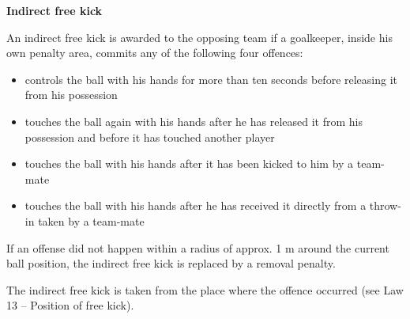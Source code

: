 \bigskip

{\bfseries Indirect free kick}

\headlinebox

An indirect free kick is awarded to the opposing team if a goalkeeper, inside his own penalty area, commits any of the following four offences: 

\begin{itemize}
\item controls the ball with his hands for more than ten seconds before releasing it from his possession
\item touches the ball again with his hands after he has released it from his possession and before it has touched another player
\item touches the ball with his hands after it has been  kicked to him by a team-mate
\item touches the ball with his hands after he has received it directly from a throw-in taken by a team-mate
\end{itemize}

\bigskip


If an offense did not happen within a radius of approx. 1 m
around the current ball position, the indirect free kick is replaced by a
removal penalty.


\bigskip

The indirect free kick is taken from the place where the offence occurred (see Law 13 -- Position of free kick). 


